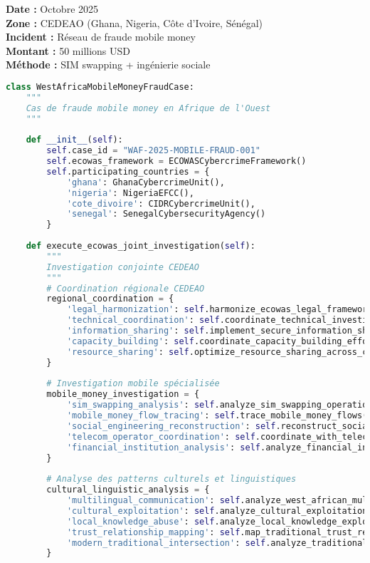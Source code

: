 \textbf{Date :} Octobre 2025 \\
\textbf{Zone :} CEDEAO (Ghana, Nigeria, Côte d'Ivoire, Sénégal) \\
\textbf{Incident :} Réseau de fraude mobile money \\
\textbf{Montant :} 50 millions USD \\
\textbf{Méthode :} SIM swapping + ingénierie sociale

\begin{lstlisting}[language=Python, caption=Investigation transfrontalière africaine mobile money]
class WestAfricaMobileMoneyFraudCase:
    """
    Cas de fraude mobile money en Afrique de l'Ouest
    """
    
    def __init__(self):
        self.case_id = "WAF-2025-MOBILE-FRAUD-001"
        self.ecowas_framework = ECOWASCybercrimeFramework()
        self.participating_countries = {
            'ghana': GhanaCybercrimeUnit(),
            'nigeria': NigeriaEFCC(),
            'cote_divoire': CIDRCybercrimeUnit(),
            'senegal': SenegalCybersecurityAgency()
        }
        
    def execute_ecowas_joint_investigation(self):
        """
        Investigation conjointe CEDEAO
        """
        # Coordination régionale CEDEAO
        regional_coordination = {
            'legal_harmonization': self.harmonize_ecowas_legal_frameworks(),
            'technical_coordination': self.coordinate_technical_investigations(),
            'information_sharing': self.implement_secure_information_sharing(),
            'capacity_building': self.coordinate_capacity_building_efforts(),
            'resource_sharing': self.optimize_resource_sharing_across_countries()
        }
        
        # Investigation mobile spécialisée
        mobile_money_investigation = {
            'sim_swapping_analysis': self.analyze_sim_swapping_operations(),
            'mobile_money_flow_tracing': self.trace_mobile_money_flows(),
            'social_engineering_reconstruction': self.reconstruct_social_engineering_campaigns(),
            'telecom_operator_coordination': self.coordinate_with_telecom_operators(),
            'financial_institution_analysis': self.analyze_financial_institution_involvement()
        }
        
        # Analyse des patterns culturels et linguistiques
        cultural_linguistic_analysis = {
            'multilingual_communication': self.analyze_west_african_multilingual_patterns(),
            'cultural_exploitation': self.analyze_cultural_exploitation_techniques(),
            'local_knowledge_abuse': self.analyze_local_knowledge_exploitation(),
            'trust_relationship_mapping': self.map_traditional_trust_relationships(),
            'modern_traditional_intersection': self.analyze_traditional_modern_payment_intersection()
        }
        

\end{lstlisting}
